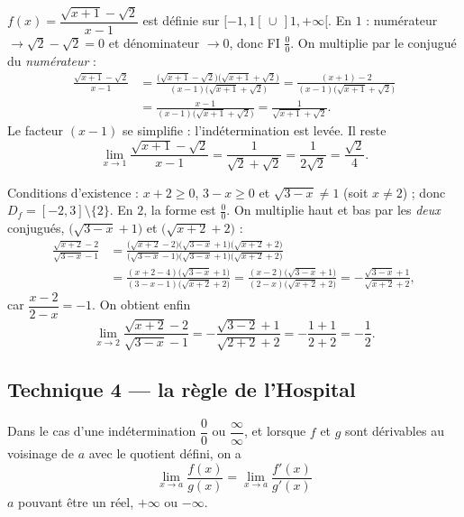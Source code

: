 \documentclass[11pt,a4paper]{article}
\begin{document}
\begin{exemple}
$f(x)=\dfrac{\sqrt{x+1}-\sqrt2}{x-1}$ est définie sur $[-1,1[\,\cup\,]1,+\infty[$. En $1$ :
numérateur $\to\sqrt2-\sqrt2=0$ et dénominateur $\to 0$, donc FI $\tfrac00$. On multiplie par le
conjugué du \emph{numérateur} :
\begin{align*}
\frac{\sqrt{x+1}-\sqrt2}{x-1}
 &=\frac{\bigl(\sqrt{x+1}-\sqrt2\bigr)\bigl(\sqrt{x+1}+\sqrt2\bigr)}{(x-1)\bigl(\sqrt{x+1}+\sqrt2\bigr)}
 =\frac{(x+1)-2}{(x-1)\bigl(\sqrt{x+1}+\sqrt2\bigr)}\\[4pt]
 &=\frac{x-1}{(x-1)\bigl(\sqrt{x+1}+\sqrt2\bigr)}
 =\frac{1}{\sqrt{x+1}+\sqrt2}.
\end{align*}
Le facteur $(x-1)$ se simplifie : l'indétermination est levée. Il reste
\[ \lim_{x\to 1}\frac{\sqrt{x+1}-\sqrt2}{x-1}=\frac{1}{\sqrt{2}+\sqrt2}=\frac{1}{2\sqrt2}=\frac{\sqrt2}{4}. \]
\end{exemple}

\begin{exemple}
Conditions d'existence : $x+2\geq 0$, $3-x\geq 0$ et $\sqrt{3-x}\neq 1$ (soit $x\neq 2$) ; donc
$D_f=[-2,3]\setminus\{2\}$. En $2$, la forme est $\tfrac00$. On multiplie haut et bas par les
\emph{deux} conjugués, $\bigl(\sqrt{3-x}+1\bigr)$ et $\bigl(\sqrt{x+2}+2\bigr)$ :
\begin{align*}
\frac{\sqrt{x+2}-2}{\sqrt{3-x}-1}
 &=\frac{\bigl(\sqrt{x+2}-2\bigr)\bigl(\sqrt{3-x}+1\bigr)\bigl(\sqrt{x+2}+2\bigr)}
        {\bigl(\sqrt{3-x}-1\bigr)\bigl(\sqrt{3-x}+1\bigr)\bigl(\sqrt{x+2}+2\bigr)}\\[4pt]
 &=\frac{(x+2-4)\bigl(\sqrt{3-x}+1\bigr)}{(3-x-1)\bigl(\sqrt{x+2}+2\bigr)}
  =\frac{(x-2)\bigl(\sqrt{3-x}+1\bigr)}{(2-x)\bigl(\sqrt{x+2}+2\bigr)}
  =-\frac{\sqrt{3-x}+1}{\sqrt{x+2}+2},
\end{align*}
car $\dfrac{x-2}{2-x}=-1$. On obtient enfin
\[ \lim_{x\to 2}\frac{\sqrt{x+2}-2}{\sqrt{3-x}-1}
   =-\frac{\sqrt{3-2}+1}{\sqrt{2+2}+2}=-\frac{1+1}{2+2}=-\frac12. \]
\end{exemple}

\subsection{Technique 4 — la règle de l'Hospital}

\begin{theoreme}
Dans le cas d'une indétermination $\dfrac00$ ou $\dfrac{\infty}{\infty}$, et lorsque $f$ et $g$
sont dérivables au voisinage de $a$ avec le quotient défini, on a
\[ \boxed{\ \lim_{x\to a}\frac{f(x)}{g(x)}=\lim_{x\to a}\frac{f'(x)}{g'(x)}\ } \]
$a$ pouvant être un réel, $+\infty$ ou $-\infty$.
\end{theoreme}
\end{document}
